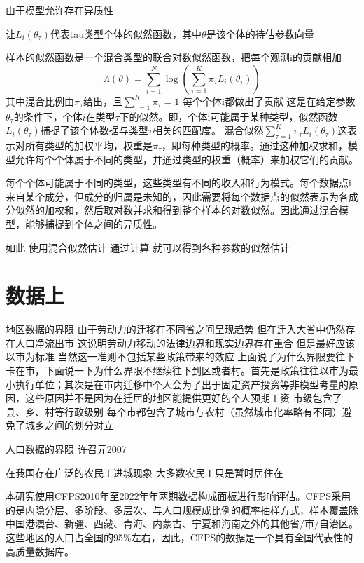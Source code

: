 \documentclass[a4paper,12pt,oneside]{book} %
\begin{document}
由于模型允许存在异质性

让$L_{i}(\theta_{\tau})$代表tau类型个体的似然函数，其中$\theta$是该个体的待估参数向量

样本的似然函数是一个混合类型的联合对数似然函数，把每个观测i的贡献相加
\begin{equation}
\Lambda(\theta)=\sum\limits_{i=1}^{N}\log(\sum\limits_{\tau=1}^{K}\pi_{\tau}L_{i}(\theta_{\tau})) 
\end{equation}
其中混合比例由$\pi_{\tau}$给出，且$\sum\limits_{\tau=1}^{K}\pi_{\tau}=1$
每个个体i都做出了贡献
这是在给定参数$\theta_{\tau}$的条件下，个体$i$在类型$\tau$下的似然。即，个体i可能属于某种类型，似然函数
$L_i(\theta_{\tau})$捕捉了该个体数据与类型$\tau$相关的匹配度。
混合似然$\sum_{\tau=1}^{K} \pi_{\tau} L_i(\theta_{\tau})$这表示对所有类型的加权平均，权重是$\pi_{\tau}$，即每种类型的概率。通过这种加权求和，模型允许每个个体属于不同的类型，并通过类型的权重（概率）来加权它们的贡献。

每个个体可能属于不同的类型，这些类型有不同的收入和行为模式。每个数据点i来自某个成分，但成分的归属是未知的，因此需要将每个数据点的似然表示为各成分似然的加权和，然后取对数并求和得到整个样本的对数似然。因此通过混合模型，能够捕捉到个体之间的异质性。


如此
使用混合似然估计
通过计算
就可以得到各种参数的似然估计




\section{数据上}

地区数据的界限
由于劳动力的迁移在不同省之间呈现趋势 但在迁入大省中仍然存在人口净流出市 这说明劳动力移动的法律边界和现实边界存在重合 但是最好应该以市为标准 当然这一准则不包括某些政策带来的效应
上面说了为什么界限要往下卡在市，下面说一下为什么界限不继续往下到区或者村。首先是政策往往以市为最小执行单位；其次是在市内迁移中个人会为了出于固定资产投资等非模型考量的原因，这些原因并不是因为在迁居的地区能提供更好的个人预期工资
市级包含了县、乡、村等行政级别 每个市都包含了城市与农村（虽然城市化率略有不同）避免了城乡之间的划分对立


人口数据的界限
许召元2007

在我国存在广泛的农民工进城现象 大多数农民工只是暂时居住在


本研究使用CFPS2010年至2022年年两期数据构成面板进行影响评估。CFPS采用的是内隐分层、多阶段、多层次、与人口规模成比例的概率抽样方式，样本覆盖除中国港澳台、新疆、西藏、青海、内蒙古、宁夏和海南之外的其他省/市/自治区。这些地区的人口占全国的95\%左右，因此，CFPS的数据是一个具有全国代表性的高质量数据库。
\end{document}
